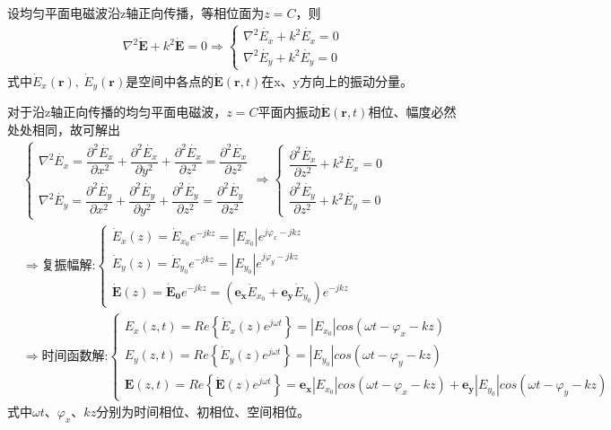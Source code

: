 \documentclass[withoutpreface,bwprint]{cumcmthesis} %
\begin{document}
设均匀平面电磁波沿z轴正向传播，等相位面为$z=C$，则
\begin{align}
    \nabla^2 \boldsymbol{\dot{E}} + k^2 \boldsymbol{\dot{E}} = 0 
    \Rightarrow 
    \begin{cases}
        \nabla^2 \dot{E_x} + k^2 \dot{E_x} = 0\\
        \nabla^2 \dot{E_y} + k^2 \dot{E_y} = 0
    \end{cases}
\end{align}
式中$\dot{E}_x(\boldsymbol{r}),\ \dot{E}_y(\boldsymbol{r})$是空间中各点的$\boldsymbol{\dot{E}}(\boldsymbol{r}, t)$在x、y方向上的振动分量。

对于沿z轴正向传播的均匀平面电磁波，$z=C$平面内振动$\boldsymbol{\dot{E}}(\boldsymbol{r}, t)$相位、幅度必然处处相同，故可解出
\begin{align}
    &\begin{cases}
        \nabla^2 \dot{E_x} = \dfrac{\partial^2 \dot{E_x}}{\partial x^2} + \dfrac{\partial^2 \dot{E_x}}{\partial y^2} + \dfrac{\partial^2 \dot{E_x}}{\partial z^2} = \dfrac{\partial^2 \dot{E_x}}{\partial z^2}\\
        \nabla^2 \dot{E_y} = \dfrac{\partial^2 \dot{E_y}}{\partial x^2} + \dfrac{\partial^2 \dot{E_y}}{\partial y^2} + \dfrac{\partial^2 \dot{E_y}}{\partial z^2} = \dfrac{\partial^2 \dot{E_y}}{\partial z^2}
    \end{cases}
    \Rightarrow 
    \begin{cases}
        \dfrac{\partial^2 \dot{E_x}}{\partial z^2} + k^2 \dot{E_x} = 0\\
        \dfrac{\partial^2 \dot{E_y}}{\partial z^2} + k^2 \dot{E_y} = 0
    \end{cases}\\
    &\Rightarrow 
    \mbox{复振幅解:}\begin{cases}
        \dot{E}_x(z) = \dot{E}_{x_0}e^{-jkz} = |E_{x_0}|e^{j\varphi_x-jkz}\\
        \dot{E}_y(z) = \dot{E}_{y_0}e^{-jkz} = |E_{y_0}|e^{j\varphi_y-jkz}\\
        \boldsymbol{\dot{E}}(z) = \boldsymbol{\dot{E}_0}e^{-jkz} = (\boldsymbol{e_x}\dot{E}_{x_0} + \boldsymbol{e_y}\dot{E}_{y_0})e^{-jkz}
    \end{cases}\nonumber\\
    &\Rightarrow 
    \mbox{时间函数解:}\begin{cases}
        E_x(z,t) = Re\left\{ \dot{E}_x(z)e^{j\omega t} \right\} = |E_{x_0}| cos(\omega t-\varphi_x-kz)\\
        E_y(z,t) = Re\left\{\dot{E}_y(z)e^{j\omega t}\right\} = |E_{y_0}| cos(\omega t-\varphi_y-kz)\\
        \boldsymbol{E}(z,t) = Re\left\{\boldsymbol{\dot{E}}(z)e^{j\omega t}\right\} = \boldsymbol{e_x}|E_{x_0}| cos(\omega t-\varphi_x-kz) + \boldsymbol{e_y}|E_{y_0}| cos(\omega t-\varphi_y-kz)
    \end{cases}\nonumber
\end{align}
式中$\omega t$、$\varphi_x$、$kz$分别为时间相位、初相位、空间相位。
\end{document}
